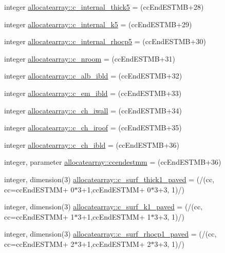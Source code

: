\begin{DoxyCompactItemize}
\item 
integer \hyperlink{namespaceallocatearray_a6b14bf47c27bd742277d65f2f6623ae4}{allocatearray\+::c\+\_\+internal\+\_\+thick5} = (cc\+End\+E\+S\+T\+MB+28)
\item 
integer \hyperlink{namespaceallocatearray_ae5939d57a10a1bdad70a9a8db727ce15}{allocatearray\+::c\+\_\+internal\+\_\+k5} = (cc\+End\+E\+S\+T\+MB+29)
\item 
integer \hyperlink{namespaceallocatearray_a00074a8f0a1de06747dd7c674cea09a6}{allocatearray\+::c\+\_\+internal\+\_\+rhocp5} = (cc\+End\+E\+S\+T\+MB+30)
\item 
integer \hyperlink{namespaceallocatearray_a40863099afa066fca952f172e733261c}{allocatearray\+::c\+\_\+nroom} = (cc\+End\+E\+S\+T\+MB+31)
\item 
integer \hyperlink{namespaceallocatearray_ad603c0d1d8d800628db261e14e19a9fb}{allocatearray\+::c\+\_\+alb\+\_\+ibld} = (cc\+End\+E\+S\+T\+MB+32)
\item 
integer \hyperlink{namespaceallocatearray_ac7604ddd8f3d387cfcb277d2576a5374}{allocatearray\+::c\+\_\+em\+\_\+ibld} = (cc\+End\+E\+S\+T\+MB+33)
\item 
integer \hyperlink{namespaceallocatearray_aba6715fe7d1cb112ef0eeb20541af378}{allocatearray\+::c\+\_\+ch\+\_\+iwall} = (cc\+End\+E\+S\+T\+MB+34)
\item 
integer \hyperlink{namespaceallocatearray_a695a45e540039b9484c1069b77d4068a}{allocatearray\+::c\+\_\+ch\+\_\+iroof} = (cc\+End\+E\+S\+T\+MB+35)
\item 
integer \hyperlink{namespaceallocatearray_ad5777b07403358943c3689a37f74bda7}{allocatearray\+::c\+\_\+ch\+\_\+ibld} = (cc\+End\+E\+S\+T\+MB+36)
\item 
integer, parameter \hyperlink{namespaceallocatearray_a97f946b42822d53377b7f67e337eac42}{allocatearray\+::ccendestmm} = (cc\+End\+E\+S\+T\+MB+36)
\item 
integer, dimension(3) \hyperlink{namespaceallocatearray_ab7f395250f896fcc5d16741a18d89d89}{allocatearray\+::c\+\_\+surf\+\_\+thick1\+\_\+paved} = (/(cc, cc=cc\+End\+E\+S\+T\+MM+ 0$\ast$3+1,cc\+End\+E\+S\+T\+MM+ 0$\ast$3+3, 1)/)
\item 
integer, dimension(3) \hyperlink{namespaceallocatearray_a70f82bab4ca451d3736e29ea97681c8e}{allocatearray\+::c\+\_\+surf\+\_\+k1\+\_\+paved} = (/(cc, cc=cc\+End\+E\+S\+T\+MM+ 1$\ast$3+1,cc\+End\+E\+S\+T\+MM+ 1$\ast$3+3, 1)/)
\item 
integer, dimension(3) \hyperlink{namespaceallocatearray_aad671adcddf83ad0ed699852d5d0a824}{allocatearray\+::c\+\_\+surf\+\_\+rhocp1\+\_\+paved} = (/(cc, cc=cc\+End\+E\+S\+T\+MM+ 2$\ast$3+1,cc\+End\+E\+S\+T\+MM+ 2$\ast$3+3, 1)/)

\end{DoxyCompactItemize}
